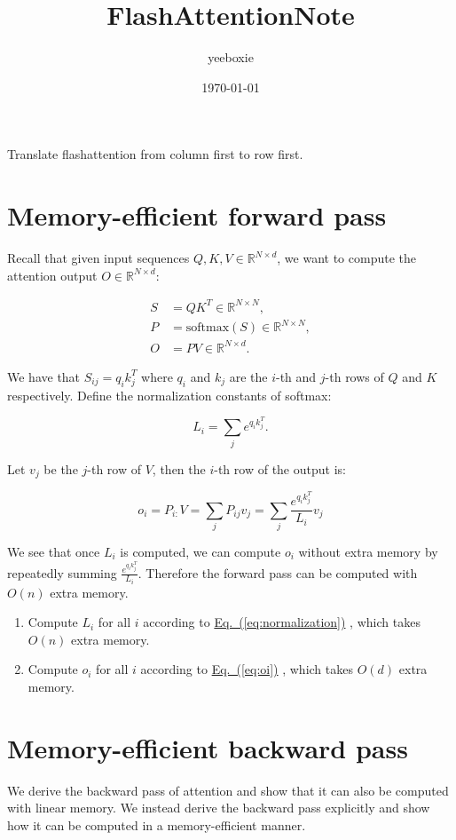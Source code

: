 \documentclass{article}
\title{FlashAttentionNote}
\author{yeeboxie}
\date{\today}
\newcommand{\redbox}[1]{%
  \colorbox{red!20}{\hyperref[#1]{Eq.~(\ref*{#1})}}%
}
\begin{document}
\maketitle

Translate flashattention from column first to row first.

\section{Memory-efficient forward pass}


Recall that given input sequences $Q, K, V \in \mathbb{R}^{N \times d}$, we want to compute the attention output $O \in \mathbb{R}^{N \times d}$:

\begin{align*}
S &= QK^T \in \mathbb{R}^{N \times N}, \\
P &= \mathrm{softmax}(S) \in \mathbb{R}^{N \times N}, \\
O &= PV \in \mathbb{R}^{N \times d}.
\end{align*}

We have that $S_{ij} = q_i k_j^T$ where $q_i$ and $k_j$ are the $i$-th and $j$-th rows of $Q$ and $K$ respectively. Define the normalization constants of softmax:

\begin{equation}
L_i = \sum_j e^{q_i k_j^T}. \label{eq:normalization}
\end{equation}

Let $v_j$ be the $j$-th row of $V$, then the $i$-th row of the output is:

\begin{equation}
    o_i = P_{i:}V = \sum_j P_{ij}v_j = \sum_j \frac{e^{q_i k_j^T}}{L_i}v_j \label{eq:oi}
\end{equation}

We see that once $L_{i}$ is computed, we can compute $o_{i}$ without extra memory by repeatedly summing $\frac{e^{q_i k_j^T}}{L_{i}}$. Therefore the forward pass can be computed with $O\left(n\right)$ extra memory.
\begin{enumerate}
    \item Compute $L_{i}$ for all $i$ according to \redbox{eq:normalization}, which takes $O\left(n\right)$ extra memory.
    \item Compute $o_{i}$ for all $i$ according to \redbox{eq:oi}, which takes $O\left(d\right)$ extra memory.
\end{enumerate}

\section{Memory-efficient backward pass}
We derive the backward pass of attention and show that it can also be computed with linear memory.  We instead derive the backward pass explicitly and show how it can be computed in a memory-efficient manner.
\end{document}
